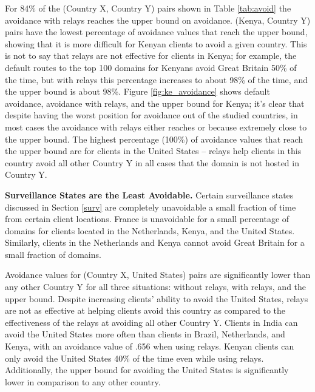 
For 84\% of the (Country X, Country Y) pairs shown in Table \ref{tab:avoid} the avoidance with relays reaches the upper bound on avoidance.  (Kenya, Country Y) pairs have the lowest percentage of avoidance values that reach the upper bound, showing that it is more difficult for Kenyan clients to avoid a given country.  This is not to say that relays are not effective for clients in Kenya; for example, the default routes to the top 100 domains for Kenyans avoid Great Britain 50\% of the time, but with relays this percentage increases to about 98\% of the time, and the upper bound is about 98\%. Figure \ref{fig:ke_avoidance} shows default avoidance, avoidance with relays, and the upper bound for Kenya; it's clear that despite having the worst position for avoidance out of the studied countries, in most cases the avoidance with relays either reaches or because extremely close to the upper bound.  The highest percentage (100\%) of avoidance values that reach the upper bound are for clients in the United States -- relays help clients in this country avoid all other Country Y in all cases that the domain is not hosted in Country Y.  

{\bf Surveillance States are the Least Avoidable.}
Certain surveillance states discussed in Section \ref{surv} are completely unavoidable a small fraction of time from certain client locations.  France is unavoidable for a small percentage of domains for clients located in the Netherlands, Kenya, and the United States.  Similarly, clients in the Netherlands and Kenya cannot avoid Great Britain for a small fraction of domains.  

Avoidance values for (Country X, United States) pairs are significantly lower than any other Country Y for all three situations: without relays, with relays, and the upper bound.   Despite increasing clients' ability to avoid the United States, relays are not as effective at helping clients avoid this country as compared to the effectiveness of the relays at avoiding all other Country Y.  Clients in India can avoid the United States more often than clients in Brazil, Netherlands, and Kenya, with an avoidance value of .656 when using relays.  Kenyan clients can only avoid the United States 40\% of the time even while using relays.  Additionally, the upper bound for avoiding the United States is significantly lower in comparison to any other country.  


